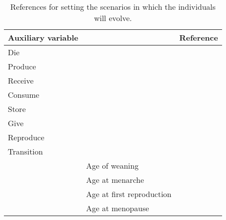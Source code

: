 \documentclass{article}
\begin{document}
\begin{table}[H]
    \centering
    \caption{References for setting the scenarios in which the individuals will evolve.}
    \begin{tabular}{ l l r }
    \hline
    Auxiliary variable & & Reference \\ 
    \hline
    Die & & \cite{gurven2007longevity} \\  
    Produce & & \cite{koster2020life} \\  
    Receive & & \cite{gurven2004give} \\  
    Consume & & \cite{kaplan2000theory,pontzer2021daily} \\  
    Store & & \cite{bowles2011cultivation} \\  
    Give & & \cite{gurven2004give} \\  
    Reproduce & & \cite{wood2017dynamics} \\  
    Transition & & \\
     & Age of weaning & \cite{wood2017dynamics}\\
     & Age at menarche & \cite{mulder1989menarche,kramer2010teen}\\
     & Age at first reproduction & \cite{wood2017dynamics} \\
     & Age at menopause & \cite{laisk2019demographic}\\
    \hline
    \end{tabular}
    \label{tab:2}
\end{table}

\clearpage



\end{document}
